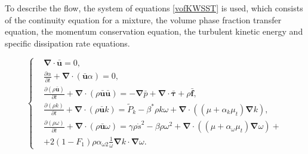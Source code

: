 \documentclass[applsci,article,submit,moreauthors,pdftex]{Definitions/mdpi}
\begin{document}
To describe the flow, the system of equations \eqref{vofKWSST} is used, which consists of the continuity equation for a mixture, the volume phase fraction transfer equation, the momentum conservation equation, the turbulent kinetic energy and specific dissipation rate equations.

\begin{equation}
	\label{vofKWSST}
	\left\{
		\begin{aligned}
			&\boldsymbol{\nabla} \cdot \bar{\boldsymbol{u}} = 0,\\
			&\frac{\partial \alpha}{\partial t} + \boldsymbol{\nabla} \cdot (\bar{\boldsymbol{u}} \alpha) = 0,\\
			&\frac{\partial (\rho \bar{\boldsymbol{u}})}{\partial t} + \boldsymbol{\nabla} \cdot (\rho \bar{\boldsymbol{u}} \bar{\boldsymbol{u}}) = -\boldsymbol{\nabla} \bar{p} + \boldsymbol{\nabla} \cdot \bar{\boldsymbol{\tau}} + \rho \bar{\boldsymbol{f}},\\
			&\frac{\partial (\rho k)}{\partial t} + \boldsymbol{\nabla} \cdot (\rho \bar{\boldsymbol{u}} k) = \widetilde{P}_k - \beta^*\rho k \omega + \boldsymbol{\nabla} \cdot \left( (\mu + \alpha_k \mu_t) \boldsymbol{\nabla} k \right),\\
			&\frac{\partial (\rho \omega)}{\partial t}  + \boldsymbol{\nabla} \cdot ( \rho \bar{\boldsymbol{u}} \omega) = \gamma \rho \dot{s}^2 - \beta \rho \omega^2 + \boldsymbol{\nabla} \cdot \left( (\mu + \alpha_\omega \mu_t) \boldsymbol{\nabla} \omega \right) + \\
			&+2 (1 - F_1) \rho \alpha_{\omega 2} \frac{1}{\omega} \boldsymbol{\nabla} k \cdot \boldsymbol{\nabla} \omega.
		\end{aligned}
	\right.
\end{equation} 
\end{document}
